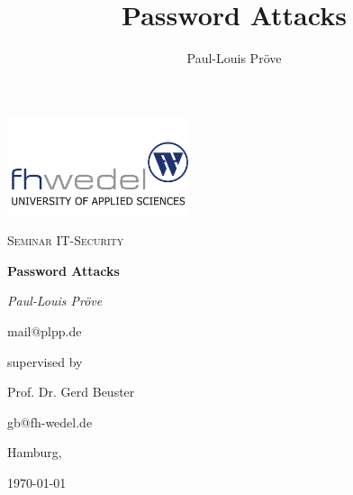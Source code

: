 \documentclass[11pt, a4paper]{article}
\title{Password Attacks}
\author{Paul-Louis Pröve}
\begin{document}
    \begin{titlepage}
    \centering
    \includegraphics[width=0.4\textwidth]{fhw.png}\par
    \vspace{1cm}
    {\scshape\Large Seminar IT-Security\par}
    \vspace{2cm}
    {\bfseries\Huge Password Attacks\par}
    \vspace{2cm}
    {\itshape\Large Paul-Louis Pröve\par}
    mail@plpp.de\par
    \vfill
    supervised by\par
    Prof. Dr. Gerd Beuster\par
    gb@fh-wedel.de\par
    \vspace{1cm}
    Hamburg,\par \today\par
    \end{titlepage}

\tableofcontents
\newpage











\end{document}
